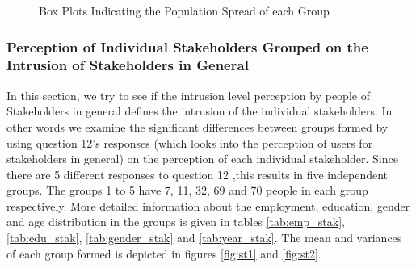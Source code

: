 \begin{figure}[htp]
\hspace{1em}
\caption{Box Plots Indicating the Population Spread of each Group}
\label{fig:st3}
\end{figure}


\subsubsection{Perception of Individual Stakeholders Grouped on the Intrusion of Stakeholders in General}

In this section, we try to see if the intrusion level perception by people of Stakeholders in general defines the intrusion of the individual stakeholders. In other words we examine the significant differences between groups formed by using question 12's responses (which looks into the perception of users for stakeholders in general) on the perception of
each individual stakeholder. Since there are 5 different responses to question 12 ,this results in five independent groups. The groups 1 to 5 have 7, 11, 32, 69 and 70 people in each group respectively. More detailed information about the employment, education, gender and age distribution in the groups is given in tables \ref{tab:emp_stak}, \ref{tab:edu_stak}, \ref{tab:gender_stak} and \ref{tab:year_stak}. The mean and variances of each group formed is depicted in figures \ref{fig:st1} and \ref{fig:st2}.

